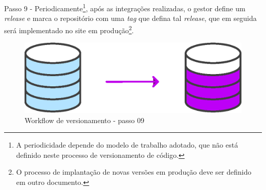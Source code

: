 Passo 9 - Periodicamente\footnote{A periodicidade depende do modelo de trabalho adotado, que não está definido neste processo de versionamento de código.}, após as integrações realizadas, o gestor define um \textit{release} e marca o repositório com uma \textit{tag} que defina tal \textit{release}, que em seguida será implementado no site em produção\footnote{O processo de implantação de novas versões em produção deve ser definido em outro documento.}.
    \begin{figure}[htb]%
        \begin{center}
            \includegraphics[scale=0.2]{./imagens/forkflow9.eps}%
        \end{center}%
        \caption{Workflow de versionamento - passo 09 \label{fig:forkflow09}}%
    \end{figure}%
